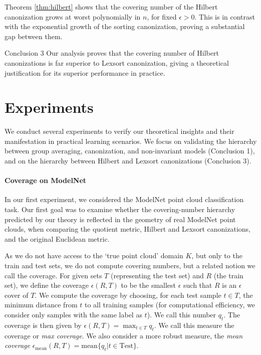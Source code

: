  Theorem \ref{thm:hilbert} shows that the covering number of the Hilbert canonization grows at worst polynomially in $n$, for fixed $\epsilon>0$. This is in contrast with the exponential growth of the sorting canonization, proving a substantial gap between them.

\begin{conclusionbox}{Conclusion 3}
 Our analysis proves that the covering number of Hilbert canonizations is far superior to Lexsort canonization, giving a theoretical justification for its superior performance in practice.
\end{conclusionbox}

\section{Experiments}
\label{sec:experiments}
We conduct several experiments to verify our theoretical insights and their manifestation in practical learning scenarios. We focus on validating the hierarchy between group averaging, canonization, and non-invariant models (Conclusion 1), and on the hierarchy between Hilbert and Lexsort canonizations (Conclusion 3).

\paragraph{Coverage on ModelNet} In our first experiment, we considered the ModelNet \cite{wu20153d} point cloud classification task. Our first goal was to examine whether the covering-number hierarchy predicted by our theory is reflected in the geometry of real ModelNet point clouds, when comparing the quotient metric, Hilbert and Lexsort canonizations, and the original Euclidean metric.

As we do not have access to the `true point cloud' domain $K$, but only to the train and test sets, we do not compute covering numbers, but a related notion we call the coverage. For given sets $T$ (representing the test set) and $R$ (the train set), we define the coverage $\epsilon(R,T)$  to be the smallest $\epsilon$ such that $R$ is an $\epsilon$ cover of $T$. We compute the coverage by choosing, for each test sample $t\in T$, the minimum distance from $t$ to all training samples (for computational efficiency, we consider only samples with the same label as $t$). We call this number $q_t$. The coverage is then given by $\epsilon(R,T)=\max_{t\in T} q_t $. We call this measure the coverage or \emph{max coverage}. We also consider a more robust measure, the \emph{mean coverage} $\epsilon_{\mathrm{mean}}(R,T)=\mathrm{mean} \{ q_t| t\in \mathrm{Test} \} $.


